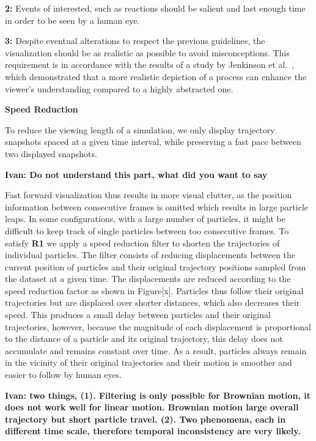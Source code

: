 \textbf{2:} Events of interested, such as reactions should be salient and last enough time in order to be seen by a human eye.

\textbf{3:} Despite eventual alterations to respect the previous guidelines, the visualization should be as realistic as possible to avoid misconceptions. This requirement is in accordance with the results of a study by Jenkinson et al.~\cite{jenkinson2012visualizing}, which demonstrated that a more realistic depiction of a process can enhance the viewer’s understanding compared to a highly abstracted one.

\textbf{Speed Reduction}

To reduce the viewing length of a simulation, we only display trajectory snapshots spaced at a given time interval, while preserving a fast pace between two displayed snapshots.

\textbf{Ivan: Do not understand this part, what did you want to say}

Fast forward visualization thus results in more visual clutter, as the position information between consecutive frames is omitted which results in large particle leaps.
In some configurations, with a large number of particles, it might be difficult to keep track of single particles between too consecutive frames.
To satisfy \textbf{R1} we apply a speed reduction filter to shorten the trajectories of individual particles.
The filter consists of reducing displacements between the current position of particles and their original trajectory positions sampled from the dataset at a given time.
The displacements are reduced according to the speed reduction factor as shown in Figure[x].
Particles thus follow their original trajectories but are displaced over shorter distances, which also decreases their speed.
This produces a small delay between particles and their original trajectories, however, because the magnitude of each displacement is proportional to the distance of a particle and its original trajectory, this delay does not accumulate and remains constant over time.
As a result, particles always remain in the vicinity of their original trajectories and their motion is smoother and easier to follow by human eyes.

\textbf{Ivan: two things, (1). Filtering is only possible for Brownian motion, it does not work well for linear motion. Brownian motion large overall trajectory but short particle travel.
(2). Two phenomena, each in different time scale, therefore temporal inconsistency are very likely.}


